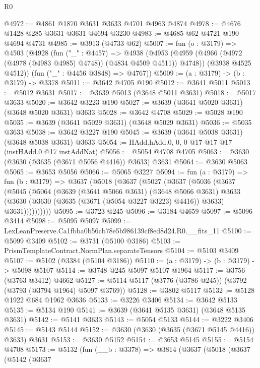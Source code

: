 \begin{lexlean}{R0}
\begin{coremodule}
@4972 := @4861 @1870 @3631 @3633 @4701 @4963 @4874
@4978 := @4676 @1428 @285 @3631 @3631 @4694 @3230
@4983 := @4685 @62 @4721 @190 @4694 @4731
@4985 := @3913 (@4733 @62)
@5007 := fun (o : @3179) =>
  @4503
    (@4928
      (fun ("_" : @4457) =>
      @4938
        (@4953 (@4959 (@4966 (@4972 (@4978 (@4983 @4985) @4748)) (@4834 @4509 @4511)) @4748))
        (@3938 @4525 @4512))
      (fun ("_" : @4456 @3848) => @4767))
@5009 := (a : @3179) -> (b : @3179) -> @3378
@5011 := @3642 @4705 @190
@5012 := @3641 @5011
@5013 := @5012 @3631
@5017 := @3639 @5013 (@3648 @5011 @3631)
@5018 := @5017 @3633
@5020 := @3642 @3223 @190
@5027 := @3639 (@3641 @5020 @3631) (@3648 @5020 @3631) @3633
@5028 := @3642 @4708
@5029 := @5028 @190
@5035 := @3639 (@3641 @5029 @3631) (@3648 @5029 @3631)
@5036 := @5035 @3633
@5038 := @3642 @3227 @190
@5045 := @3639 (@3641 @5038 @3631) (@3648 @5038 @3631) @3633
@5054 := HAdd.hAdd.{0, 0, 0} @17 @17 @17 (instHAdd.{0} @17 instAddNat)
@5056 := @5054 @4708 @4705
@5063 := @3630 (@3630 (@3635 (@3671 @5056 @4416)) @3633) @3631
@5064 := @3630 @5063
@5065 := @3653 @5056
@5066 := @5065 @3227
@5094 := fun (a : @3179) =>
  fun (b : @3179) =>
  @3637
    (@5018
      (@3637
        (@5027
          (@3637
            (@5036
              (@3637
                (@5045
                  (@5064
                    (@3639
                      (@3641 @5066 @3631)
                      (@3648 @5066 @3631)
                      @3633
                      (@3630 (@3630 (@3635 (@3671 (@5054 @3227 @3223) @4416)) @3633) @3631))))))))))
@5095 := @3723 @245
@5096 := @3184 @4659
@5097 := @5096 @3414
@5098 := @5095 @5097
@5099 := LexLeanPreserve.Ca1fbba0b56cb78e5b986139cf8ed8d24.R0.__fits_11
@5100 := @5099 @3409
@5102 := @3731 (@5100 @3186)
@5103 := PrismTemplateContract.NormPlan.separateTensors
@5104 := @5103 @3409
@5107 := @5102 (@3384 (@5104 @3186))
@5110 := (a : @3179) -> (b : @3179) -> @5098 @5107
@5114 := @3748 @245 @5097 @5107 @1964
@5117 := @3756 (@3763 @3412) @4662
@5127 := @5114 @5117 (@3776 (@3786 @245)) (@3792 (@3793 (@3794 @1964) @5097 @3769))
@5128 := @3802 @5117
@5132 := @5128 @1922 @684 @1962 @3636
@5133 := @3226 @3406
@5134 := @3642 @5133
@5135 := @5134 @190
@5141 := @3639 (@3641 @5135 @3631) (@3648 @5135 @3631)
@5142 := @5141 @3633
@5143 := @5054 @5133
@5144 := @3222 @3406
@5145 := @5143 @5144
@5152 := @3630 (@3630 (@3635 (@3671 @5145 @4416)) @3633) @3631
@5153 := @3630 @5152
@5154 := @3653 @5145
@5155 := @5154 @4708
@5173 := @5132
    (fun (__b : @3378) =>
    @3814
      (@3637
        (@5018
          (@3637
            (@5142
              (@3637

\end{coremodule}
\end{lexlean}
